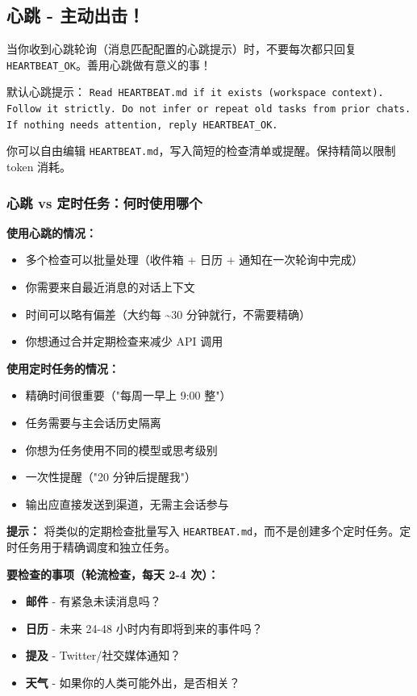 \subsection{心跳 - 主动出击！}


当你收到心跳轮询（消息匹配配置的心跳提示）时，不要每次都只回复 \texttt{HEARTBEAT\_OK}。善用心跳做有意义的事！

默认心跳提示：
\texttt{Read HEARTBEAT.md if it exists (workspace context). Follow it strictly. Do not infer or repeat old tasks from prior chats. If nothing needs attention, reply HEARTBEAT\_OK.}

你可以自由编辑 \texttt{HEARTBEAT.md}，写入简短的检查清单或提醒。保持精简以限制 token 消耗。

\subsubsection{心跳 vs 定时任务：何时使用哪个}


\textbf{使用心跳的情况：}

\begin{itemize}
  \item 多个检查可以批量处理（收件箱 + 日历 + 通知在一次轮询中完成）
  \item 你需要来自最近消息的对话上下文
  \item 时间可以略有偏差（大约每 \textasciitilde{}30 分钟就行，不需要精确）
  \item 你想通过合并定期检查来减少 API 调用
\end{itemize}


\textbf{使用定时任务的情况：}

\begin{itemize}
  \item 精确时间很重要（"每周一早上 9:00 整"）
  \item 任务需要与主会话历史隔离
  \item 你想为任务使用不同的模型或思考级别
  \item 一次性提醒（"20 分钟后提醒我"）
  \item 输出应直接发送到渠道，无需主会话参与
\end{itemize}


\textbf{提示：} 将类似的定期检查批量写入 \texttt{HEARTBEAT.md}，而不是创建多个定时任务。定时任务用于精确调度和独立任务。

\textbf{要检查的事项（轮流检查，每天 2-4 次）：}

\begin{itemize}
  \item \textbf{邮件} - 有紧急未读消息吗？
  \item \textbf{日历} - 未来 24-48 小时内有即将到来的事件吗？
  \item \textbf{提及} - Twitter/社交媒体通知？
  \item \textbf{天气} - 如果你的人类可能外出，是否相关？
\end{itemize}



